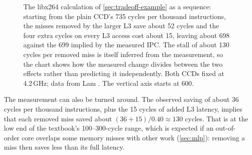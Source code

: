 \begin{figure}[htbp]
\centering
{}
\caption[The libx264 calculation as a sequence]{The libx264 calculation of \cref{sec:tradeoff-example} as a sequence: starting from the plain CCD's 735 cycles per thousand instructions, the misses removed by the larger L3 save about 52 cycles and the four extra cycles on every L3 access cost about 15, leaving about 698 against the 699 implied by the measured IPC. The stall of about 130 cycles per removed miss is itself inferred from the measurement, so the chart shows how the measured change divides between the two effects rather than predicting it independently. Both CCDs fixed at 4.2\,GHz; data from Lam \cite{lamAMDs7950X3DZen2023}. The vertical axis starts at 600.}
\label{fig:libx264-waterfall}
\end{figure}


The measurement can also be turned around. The observed saving of about 36 cycles per thousand instructions, plus the 15 cycles of added L3 latency, implies that each removed miss saved about $(36 + 15)/0.40 \approx 130$ cycles. That is at the low end of the textbook's 100--300-cycle range, which is expected if an out-of-order core overlaps some memory misses with other work (\cref{sec:mlp}): removing a miss then saves less than its full latency.

